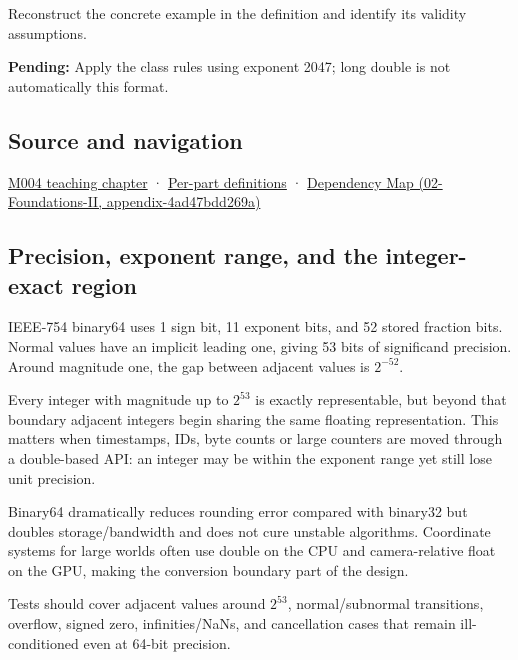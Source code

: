 Reconstruct the concrete example in the definition and identify its validity assumptions.

\textbf{Pending:} Apply the class rules using exponent 2047; long double is not automatically this format.

\subsection{Source and navigation}\label{source-and-navigation}

\href{Continuous\%20Notes/Computing\%20Foundations\%20-\%20From\%20Bits\%20to\%20C++\%20and\%20Systems\%20APIs\#A\%20stretching\%20ruler\%20for\%20real-valued\%20quantities}{M004 teaching chapter} · \hyperref[appendix-fd090d982a15]{Per-part definitions} · \href{}{Dependency Map (02-Foundations-II, appendix-4ad47bdd269a)}

\subsection{Precision, exponent range, and the integer-exact region}\label{precision-exponent-range-and-the-integer-exact-region}

IEEE-754 binary64 uses 1 sign bit, 11 exponent bits, and 52 stored fraction bits. Normal values have an implicit leading one, giving 53 bits of significand precision. Around magnitude one, the gap between adjacent values is \(2^{-52}\).

Every integer with magnitude up to \(2^{53}\) is exactly representable, but beyond that boundary adjacent integers begin sharing the same floating representation. This matters when timestamps, IDs, byte counts or large counters are moved through a double-based API: an integer may be within the exponent range yet still lose unit precision.

Binary64 dramatically reduces rounding error compared with binary32 but doubles storage/bandwidth and does not cure unstable algorithms. Coordinate systems for large worlds often use double on the CPU and camera-relative float on the GPU, making the conversion boundary part of the design.

Tests should cover adjacent values around \(2^{53}\), normal/subnormal transitions, overflow, signed zero, infinities/NaNs, and cancellation cases that remain ill-conditioned even at 64-bit precision.
